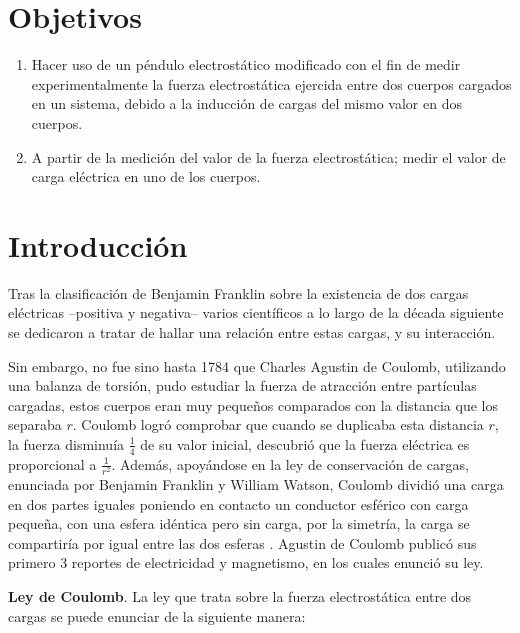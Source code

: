 \documentclass[letterpaper, 11 pt]{article}
\begin{document}
\begin{multicols*}{2}

\section{Objetivos}

\begin{enumerate}
    \item Hacer uso de un péndulo electrostático modificado con el fin de medir experimentalmente la fuerza electrostática ejercida entre dos cuerpos cargados en un sistema, debido a la inducción de cargas del mismo valor en dos cuerpos.
    \item A partir de la medición del valor de la fuerza electrostática; medir el valor de carga eléctrica en uno de los cuerpos.
    
\end{enumerate}

\section{Introducción}
Tras la clasificación de Benjamin Franklin sobre la existencia de dos cargas eléctricas --positiva y negativa-- varios científicos a lo largo de la década siguiente se dedicaron a tratar de hallar una relación entre estas cargas, y su interacción.

Sin embargo, no fue sino hasta 1784 que Charles Agustin de Coulomb, utilizando una balanza de torsión, pudo estudiar la fuerza de atracción entre partículas cargadas, estos cuerpos eran muy pequeños comparados con la distancia que los separaba $r$. Coulomb logró comprobar que cuando se duplicaba esta distancia $r$, la fuerza disminuía $\frac{1}{4}$ de su valor inicial, descubrió que la fuerza eléctrica es proporcional a $\frac{1}{r^2}$. Además, apoyándose en la ley de conservación de cargas, enunciada por Benjamin Franklin y William Watson, Coulomb dividió una carga en dos partes iguales poniendo en contacto un conductor esférico con carga pequeña, con una esfera idéntica pero sin carga, por la simetría, la carga se compartiría por igual entre las dos esferas \cite{resnik2002}. Agustin de Coulomb publicó sus primero 3 reportes de electricidad y magnetismo, en los cuales enunció su ley.


\textbf{Ley de Coulomb}. La ley que trata sobre la fuerza electrostática entre dos cargas se puede enunciar de la siguiente manera:


\end{multicols*}
\end{document}
